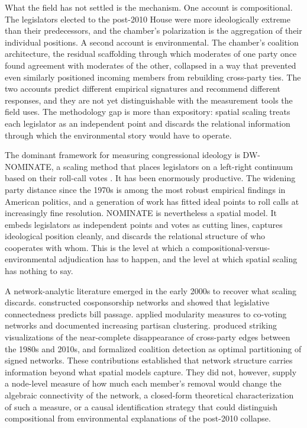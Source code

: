 \documentclass[12pt, a4paper]{article}
\begin{document}
What the field has not settled is the mechanism. One account is compositional. The legislators elected to the post-2010 House were more ideologically extreme than their predecessors, and the chamber's polarization is the aggregation of their individual positions. A second account is environmental. The chamber's coalition architecture, the residual scaffolding through which moderates of one party once found agreement with moderates of the other, collapsed in a way that prevented even similarly positioned incoming members from rebuilding cross-party ties. The two accounts predict different empirical signatures and recommend different responses, and they are not yet distinguishable with the measurement tools the field uses. The methodology gap is more than expository: spatial scaling treats each legislator as an independent point and discards the relational information through which the environmental story would have to operate.

The dominant framework for measuring congressional ideology is DW-NOMINATE, a scaling method that places legislators on a left-right continuum based on their roll-call votes \citep{poole1985, poole2017}. It has been enormously productive. The widening party distance since the 1970s is among the most robust empirical findings in American politics, and a generation of work has fitted ideal points to roll calls at increasingly fine resolution. NOMINATE is nevertheless a spatial model. It embeds legislators as independent points and votes as cutting lines, captures ideological position cleanly, and discards the relational structure of who cooperates with whom. This is the level at which a compositional-versus-environmental adjudication has to happen, and the level at which spatial scaling has nothing to say.

A network-analytic literature emerged in the early 2000s to recover what scaling discards. \citet{fowler2006a} constructed cosponsorship networks and showed that legislative connectedness predicts bill passage. \citet{waugh2009} applied modularity measures to co-voting networks and documented increasing partisan clustering. \citet{andris2015} produced striking visualizations of the near-complete disappearance of cross-party edges between the 1980s and 2010s, and \citet{aref2020} formalized coalition detection as optimal partitioning of signed networks. These contributions established that network structure carries information beyond what spatial models capture. They did not, however, supply a node-level measure of how much each member's removal would change the algebraic connectivity of the network, a closed-form theoretical characterization of such a measure, or a causal identification strategy that could distinguish compositional from environmental explanations of the post-2010 collapse.
\end{document}
